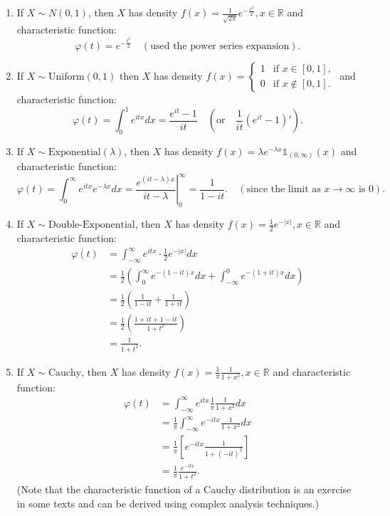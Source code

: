 \begin{enumerate}
  \item If \(X \sim N(0,1)\), then \(X\) has density \(f(x) = \frac{1}{\sqrt{2\pi}} e^{-\frac{x^2}{2}}, x \in \mathbb{R}\) and characteristic function: \[\varphi(t) = e^{-\frac{t^2}{2}} \quad (\text{used the power series expansion}).\]

  \item If \(X \sim \text{Uniform}(0,1)\) then \(X\) has density \(f(x) = \begin{cases} 
  1 & \text{if } x \in [0,1], \\
  0 & \text{if } x \notin [0,1].
  \end{cases}\) and characteristic function: \[\varphi(t) = \int_{0}^{1} e^{itx} dx = \frac{e^{it} - 1}{it} \quad \left( \text{or} \quad \frac{1}{it} (e^{it} - 1)' \right).\]

  \item If \(X \sim \text{Exponential}(\lambda)\), then \(X\) has density \(f(x) = \lambda e^{-\lambda x} \mathbb{1}_{(0, \infty)}(x)\) and characteristic function: \[\varphi(t) = \int_{0}^{\infty} e^{itx} e^{-\lambda x} dx = \left. \frac{e^{(it-\lambda)x}}{it-\lambda} \right|_{0}^{\infty} = \frac{1}{1 - it}. \quad (\text{since the limit as } x \to \infty \text{ is } 0).\]
  \item If \(X \sim \text{Double-Exponential}\), then \(X\) has density \(f(x) = \frac{1}{2} e^{-|x|}, x \in \mathbb{R}\) and characteristic function:
  \begin{align*}
    \varphi(t) &= \int_{-\infty}^{\infty} e^{itx} \cdot \frac{1}{2}e^{-|x|} dx \\
    &= \frac{1}{2} \left( \int_{0}^{\infty} e^{-(1-it)x} dx + \int_{-\infty}^{0} e^{-(1+it)x} dx \right) \\
    &= \frac{1}{2} \left( \frac{1}{1-it} + \frac{1}{1+it} \right) \\
    &= \frac{1}{2} \left( \frac{1+it + 1-it}{1+t^2} \right) \\
    &= \frac{1}{1+t^2}.
  \end{align*}
  
  \item If \(X \sim \text{Cauchy}\), then \(X\) has density \(f(x) = \frac{1}{\pi} \frac{1}{1+x^2}, x \in \mathbb{R}\) and characteristic function:
  \begin{align*}
    \varphi(t) &= \int_{-\infty}^{\infty} e^{itx} \frac{1}{\pi} \frac{1}{1+x^2} dx \\
    &= \frac{1}{\pi} \int_{-\infty}^{\infty} e^{-itx} \frac{1}{1+x^2} dx \\
    &= \frac{1}{\pi} \left[ e^{-itx} \frac{1}{1+(-it)^2} \right] \\
    &= \frac{1}{\pi} \frac{e^{-itx}}{1+t^2}.
  \end{align*}
  (Note that the characteristic function of a Cauchy distribution is an exercise in some texts and can be derived using complex analysis techniques.)
\end{enumerate}


